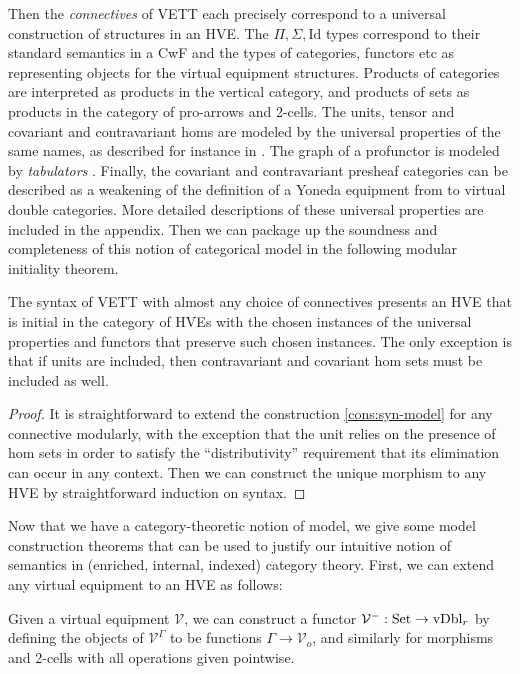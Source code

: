 \documentclass{llncs}
\begin{document}
Then the \emph{connectives} of VETT each precisely correspond to a
universal construction of structures in an HVE. The
$\Pi,\Sigma,\text{Id}$ types correspond to their standard semantics in
a CwF and the types of categories, functors etc as representing
objects for the virtual equipment structures. Products of categories
are interpreted as products in the vertical category, and products of
sets as products in the category of pro-arrows and 2-cells. The units,
tensor and covariant and contravariant homs are modeled by the
universal properties of the same names, as described for instance in
\citet{shulmanFrBicats}. The graph of a profunctor is modeled by
\emph{tabulators} \citet{grandis-pare}. Finally, the covariant and
contravariant presheaf categories can be described as a weakening of
the definition of a Yoneda equipment from \citet{yosegi-boxes} to
virtual double categories. More detailed descriptions of these
universal properties are included in the appendix.
%
Then we can package up the soundness and completeness of this notion
of categorical model in the following modular initiality theorem.

\begin{theorem}[Initiality]
  The syntax of VETT with almost any choice of connectives presents an
  HVE that is initial in the category of HVEs with the chosen
  instances of the universal properties and functors that preserve
  such chosen instances. The only exception is that if units are
  included, then contravariant and covariant hom sets must be included
  as well.
\end{theorem}
\begin{proof}
  It is straightforward to extend the construction
  \ref{cons:syn-model} for any connective modularly, with the
  exception that the unit relies on the presence of hom sets in order
  to satisfy the ``distributivity'' requirement that its elimination
  can occur in any context. Then we can construct the unique morphism
  to any HVE by straightforward induction on syntax.
\end{proof}


Now that we have a category-theoretic notion of model, we give some
model construction theorems that can be used to justify our intuitive
notion of semantics in (enriched, internal, indexed) category theory.
%
First, we can extend any virtual equipment to an HVE as follows:
\begin{construction}
  Given a virtual equipment $\mathcal V$, we
  can construct a functor $\mathcal V^{-}: \textrm{Set} \to \text{vDbl}_r$ by
  defining the objects of $\mathcal V^\Gamma$ to be functions $\Gamma
  \to \mathcal V_o$, and similarly for morphisms and 2-cells with all
  operations given pointwise. 
\end{construction}
\end{document}
